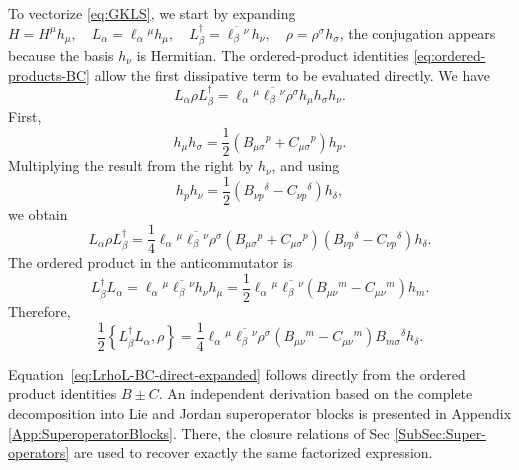 \documentclass[notitlepage,aip,reprint,onecolumn]{revtex4-1}
\theoremstyle{definition}
\newcommand{\acom}[2]{\left\{#1,#2\right\}}
\begin{document}
To vectorize \eqref{eq:GKLS}, we start by expanding
\(
    H=H^\mu h_\mu,
    \quad
    L_\alpha=\ell_\alpha{}^\mu h_\mu,
    \quad
    L_\beta^\dagger=\overline{\ell_\beta{}^\nu}\,h_\nu,
    \quad
    \rho=\rho^\sigma h_\sigma
\), the conjugation appears because the basis \(h_\nu\) is Hermitian. 
The ordered-product identities \eqref{eq:ordered-products-BC} allow the first dissipative term to be evaluated directly. We have
\[
    L_\alpha\rho L_\beta^\dagger
    =
    \ell_\alpha{}^\mu
    \overline{\ell_\beta{}^\nu}
    \rho^\sigma
    h_\mu h_\sigma h_\nu.
\]
First,
\[
    h_\mu h_\sigma
    =
    \frac12
    \left(
    B_{\mu\sigma}{}^p
    +
    C_{\mu\sigma}{}^p
    \right)h_p.
\]
Multiplying the result from the right by \(h_\nu\), and using
\[
    h_p h_\nu
    =
    \frac12
    \left(
    B_{\nu p}{}^\delta
    -
    C_{\nu p}{}^\delta
    \right)h_\delta,
\]
we obtain
\begin{equation}\label{eq:LrhoL-BC-direct-expanded}
    L_\alpha\rho L_\beta^\dagger
    =
    \frac14
    \ell_\alpha{}^\mu
    \overline{\ell_\beta{}^\nu}
    \rho^\sigma
    \left(
    B_{\mu\sigma}{}^p
    +
    C_{\mu\sigma}{}^p
    \right)
    \left(
    B_{\nu p}{}^\delta
    -
    C_{\nu p}{}^\delta
    \right)
    h_\delta.
\end{equation}
The ordered product in the anticommutator is
\[
    L_\beta^\dagger L_\alpha
    =
    \ell_\alpha{}^\mu
    \overline{\ell_\beta{}^\nu}
    h_\nu h_\mu
    =
    \frac12
    \ell_\alpha{}^\mu
    \overline{\ell_\beta{}^\nu}
    \left(B_{\mu\nu}{}^m-C_{\mu\nu}{}^m\right)h_m.
\]
Therefore,
\begin{equation}\label{eq:anticommutator-short}
    \frac12\acom{L_\beta^\dagger L_\alpha}{\rho}
    =
    \frac14
    \ell_\alpha{}^\mu
    \overline{\ell_\beta{}^\nu}
    \rho^\sigma
    \left(B_{\mu\nu}{}^m-C_{\mu\nu}{}^m\right)
    B_{m\sigma}{}^\delta h_\delta.
\end{equation}
%

Equation~\eqref{eq:LrhoL-BC-direct-expanded} follows directly from the ordered product identities \(B\pm C\). An independent derivation based on the complete decomposition into Lie and Jordan superoperator blocks is presented in Appendix \ref{App:SuperoperatorBlocks}. There, the closure
relations of Sec \ref{SubSec:Super-operators} are used to recover exactly the same factorized expression.
%
\end{document}
